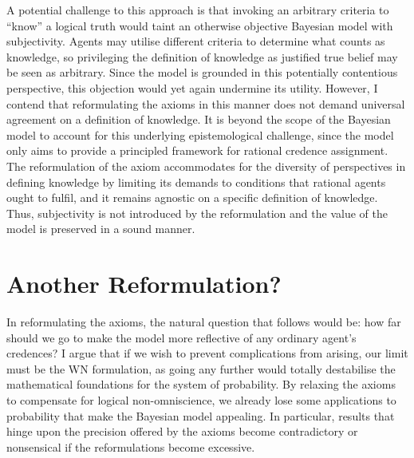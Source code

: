 \documentclass[12pt]{article}
\begin{document}
A potential challenge to this approach is that invoking an arbitrary criteria to ``know'' a logical truth would taint an otherwise objective Bayesian model with subjectivity. Agents may utilise different criteria to determine what counts as knowledge, so privileging the definition of knowledge as justified true belief may be seen as arbitrary. Since the model is grounded in this potentially contentious perspective, this objection would yet again undermine its utility. However, I contend that reformulating the axioms in this manner does not demand universal agreement on a definition of knowledge. It is beyond the scope of the Bayesian model to account for this underlying epistemological challenge, since the model only aims to provide a principled framework for rational credence assignment. The reformulation of the axiom accommodates for the diversity of perspectives in defining knowledge by limiting its demands to conditions that rational agents ought to fulfil, and it remains agnostic on a specific definition of knowledge. Thus, subjectivity is not introduced by the reformulation and the value of the model is preserved in a sound manner.

\section{Another Reformulation?}
In reformulating the axioms, the natural question that follows would be: how far should we go to make the model more reflective of any ordinary agent's credences? I argue that if we wish to prevent complications from arising, our limit must be the WN formulation, as going any further would totally destabilise the mathematical foundations for the system of probability. By relaxing the axioms to compensate for logical non-omniscience, we already lose some applications to probability that make the Bayesian model appealing.\autocite[436]{oup} In particular, results that hinge upon the precision offered by the axioms become contradictory or nonsensical if the reformulations become excessive.
\end{document}
